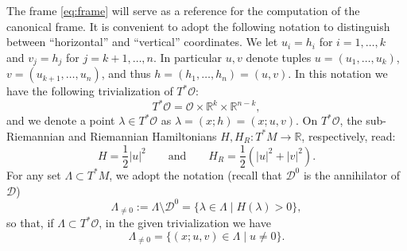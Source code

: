 \documentclass[11pt,a4paper]{article}
\theoremstyle{plain}
\theoremstyle{definition}
\theoremstyle{remark}
\numberwithin{equation}{section}
\newcommand{\R}{\mathbb{R}} %
\newcommand{\distr}{\mathscr{D}}
\begin{document}
The frame \eqref{eq:frame} will serve as a reference for the computation of the canonical frame. It is convenient to adopt the following notation to distinguish between ``horizontal'' and ``vertical'' coordinates. We let $u_i = h_i$ for $i=1,\dots,k$ and $v_j = h_j$ for $j=k+1,\dots,n$. In particular $u,v$ denote tuples $u=(u_1,\dots,u_k)$, $v=(u_{k+1},\dots,u_n)$, and thus $h=(h_1,\dots,h_n) = (u,v)$. In this notation we have the following trivialization of $T^*\mathcal{O}$:
\begin{equation}
T^*\mathcal{O} = \mathcal{O} \times \R^{k} \times \R^{n-k},
\end{equation}
and we denote a point $\lambda \in T^*\mathcal{O}$ as $\lambda = (x;h)=(x;u,v)$. On $T^*\mathcal{O}$, the sub-Riemannian and Riemannian Hamiltonians $H,H_R:T^*M \to \R$, respectively, read:
\begin{equation}
H =\frac{1}{2}|u|^2\qquad \text{and} \qquad H_R = \frac{1}{2}\left(|u|^2+|v|^2\right).
\end{equation}
For any set $\Lambda \subset T^*M$, we adopt the notation (recall that $ \distr^0$ is the annihilator of $\distr$)
\begin{equation}\label{eq:0}
\Lambda_{\neq 0}:= \Lambda \setminus \distr^0 = \{\lambda \in \Lambda \mid H(\lambda)>0\},
\end{equation}
so that, if $\Lambda\subset T^*\mathcal{O}$, in the given trivialization we have
\begin{equation}
\Lambda_{\neq 0} = \{(x;u,v)\in \Lambda \mid u \neq 0\}.
\end{equation}
\end{document}
